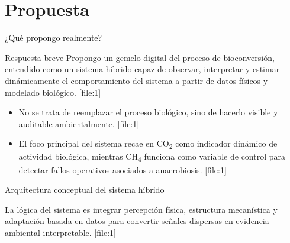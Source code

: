 \documentclass[10pt,aspectratio=169]{beamer}
\newcommand{\basecite}{\hfill{\color{griscita}\tiny [file:1]}}
\begin{document}
\section{Propuesta}

\begin{frame}{¿Qué propongo realmente?}
\justifying
\begin{block}{Respuesta breve}
Propongo un gemelo digital del proceso de bioconversión, entendido como un sistema híbrido capaz de observar, interpretar y estimar dinámicamente el comportamiento del sistema a partir de datos físicos y modelado biológico. \basecite
\end{block}

\pause
\begin{itemize}
    \item No se trata de reemplazar el proceso biológico, sino de hacerlo visible y auditable ambientalmente. \basecite
    \item El foco principal del sistema recae en CO\textsubscript{2} como indicador dinámico de actividad biológica, mientras CH\textsubscript{4} funciona como variable de control para detectar fallos operativos asociados a anaerobiosis. \basecite
\end{itemize}
\end{frame}

\begin{frame}{Arquitectura conceptual del sistema híbrido}
\centering
{}

\vspace{0.6em}
\justifying
La lógica del sistema es integrar percepción física, estructura mecanística y adaptación basada en datos para convertir señales dispersas en evidencia ambiental interpretable. \basecite
\end{frame}
\end{document}
